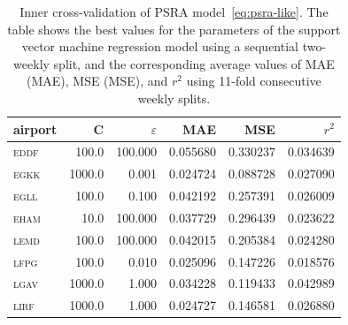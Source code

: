 \documentclass[draft,review]{elsarticle}
\newcommand{\airp}[1]{\textcolor{#1}{\textsc{#1}}}
\begin{document}
\begin{table}
  \caption{Inner cross-validation of \acs{PSRA} model~\eqref{eq:psra-like}. The table shows the best values for the parameters of the support vector machine regression model using a sequential two-weekly split, and the corresponding average values of \acl{MAE} (\acs{MAE}), \acl{MSE} (\acs{MSE}), and \(r^2\) using 11-fold consecutive weekly splits.}\label{tab:inner_cv}
  \centering
  \begin{tabular}{lrrrrr}
    \toprule
    airport &       C &    \(\varepsilon\) &       \acs{MAE} &       \acs{MSE} &        \(r^2\) \\
    \midrule
    \airp{eddf} &   100.0 &  100.000 &  0.055680 &  0.330237 &  0.034639 \\
    \airp{egkk} &  1000.0 &    0.001 &  0.024724 &  0.088728 &  0.027090 \\
    \airp{egll} &   100.0 &    0.100 &  0.042192 &  0.257391 &  0.026009 \\
    \airp{eham} &    10.0 &  100.000 &  0.037729 &  0.296439 &  0.023622 \\
    \airp{lemd} &   100.0 &  100.000 &  0.042015 &  0.205384 &  0.024280 \\
    \airp{lfpg} &   100.0 &    0.010 &  0.025096 &  0.147226 &  0.018576 \\
    \airp{lgav} &  1000.0 &    1.000 &  0.034228 &  0.119433 &  0.042989 \\
    \airp{lirf} &  1000.0 &    1.000 &  0.024727 &  0.146581 &  0.026880 \\
    \bottomrule
  \end{tabular}
\end{table}
\end{document}
